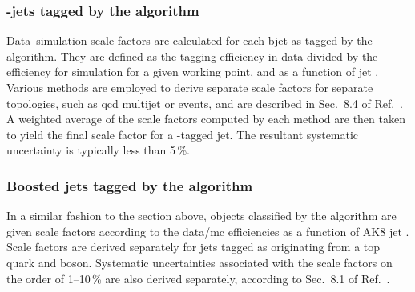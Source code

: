 



\subsubsection{\texorpdfstring{\Pbottom-jets}{b-jets} tagged by the \texorpdfstring{\deepcsv}{DeepCSV} algorithm}
\label{subsubsec:htoinv_btagging_sfs}

Data--simulation scale factors are calculated for each \gls{bjet} as tagged by the \deepcsv algorithm. They are defined as the tagging efficiency in data divided by the efficiency for simulation for a given working point, and as a function of \gls{jet} \pt. Various methods are employed to derive separate scale factors for separate topologies, such as \acrshort{qcd} multijet or \ttbar events, and are described in Sec.~8.4 of Ref.~. A weighted average of the scale factors computed by each method are then taken to yield the final scale factor for a \Pbottom-tagged \gls{jet}. The resultant systematic uncertainty is typically less than 5\,\%.





\subsubsection{Boosted jets tagged by the \texorpdfstring{\deepakeight}{DeepAK8} algorithm}
\label{subsubsec:htoinv_deepak8_sfs}

In a similar fashion to the section above, objects classified by the \deepakeight algorithm are given scale factors according to the data/\acrshort{mc} efficiencies as a function of AK8 \gls{jet} \pt. Scale factors are derived separately for \glspl{jet} tagged as originating from a top quark and \PVec boson. Systematic uncertainties associated with the scale factors on the order of 1--10\,\% are also derived separately, according to Sec.~8.1 of Ref.~.




